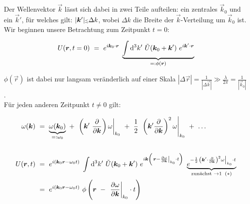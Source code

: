 Der Wellenvektor $\vec{k}$ lässt sich dabei in zwei Teile aufteilen: ein zentrales $\vec{k}_0$ und ein $\vec{k}'$, für welches gilt: $|\vec{k}'| \mathsmaller{\mathsmaller{\lesssim}} \Delta k$, wobei $\Delta k$ die Breite der $\vec{k}$-Verteilung um $\vec{k}_0$ ist.\\
Wir beginnen unsere Betrachtung zum Zeitpunkt $t=0$:

\begin{equation*}
U(\bm{r},t=0) \ = \ e^{i\bm{k}_0 \cdot\bm{r}} \; \underbrace{\int\mathrm{d}^3 k' \ \tilde{U}(\bm{k}_0 + \bm{k}') \ e^{i\bm{k}'\cdot\bm{r}}}_{=: \phi(\bm{r})}
\end{equation*}

$\phi(\vec{r})$ ist dabei nur langsam veränderlich auf einer Skala $|\Delta \vec{r}| = \frac{1}{|\Delta \vec{k}|} \gg \frac{\lambda}{2\pi}= \frac{1}{|\vec{k}_0|}$.\\
Für jeden anderen Zeitpunkt $t \neq 0$ gilt:

\begin{align*}
\omega(\vec{k}) \ &= \ \underbrace{\omega(\vec{k}_0)}_{=:\omega_0} \ + \ \left.\left(\vec{k}' \ \pdiff{}{\vec{k}}\right)\omega\right|_{k_0} \ + \ \frac{1}{2} \ \left.\left(\vec{k}'\pdiff{}{\vec{k}}\right)^2\omega\right|_{k_0} \ + \ \ldots\\
\ \\
U(\vec{r},t)  \ &= \ e^{i(\vec{k}_0\vec{r}-\omega_0 t)} \; \int\d^3 k' \ \tilde{U}(\vec{k}_0 + \vec{k}') \ e^{i\vec{k}\left(\left.\vec{r}-\pdiff{\omega}{\vec{k}}\right|_{k_0} \cdot t\right)} \ \underbrace{e^{-\frac{1}{2}\left.\left(\vec{k}' \cdot \pdiff{}{\vec{k}}\right)^2\omega\right|_{k_0} \cdot t}}_{\text{zunächst } \rightarrow 1 \; \; (*)}\\
&= \ e^{i(\vec{k}_0\vec{r} - \omega_0 t)} \ \phi\left(\vec{r} \ - \ \left.\pdiff{\omega}{\vec{k}}\right|_{k_0} \cdot t \right)
\end{align*}

